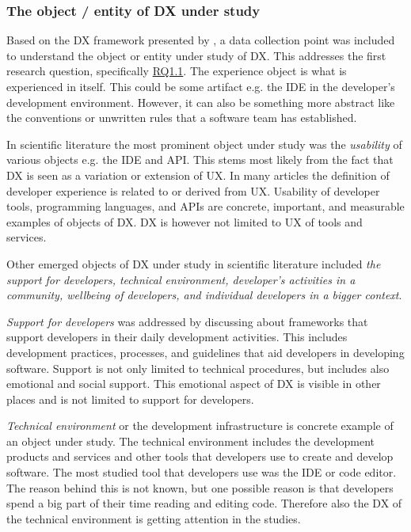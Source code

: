 \documentclass[english, 12pt, a4paper, sci, utf8, a-1b, online]{aaltothesis}
\newcounter{subsubsubsection}[subsubsection]
\begin{document}
\subsubsection{The object / entity of DX under study}

Based on the DX framework presented by \citet{fagerholm-doctoral-thesis}, a data collection point was included to understand the object or entity under study of DX. This addresses the first research question, specifically \hyperref[RQ1.1]{RQ1.1}. The experience object is what is experienced in itself. This could be some artifact e.g. the IDE in the developer's development environment. However, it can also be something more abstract like the conventions or unwritten rules that a software team has established.


In scientific literature the most prominent object under study was the \textit{usability} of various objects e.g. the IDE and API. This stems most likely from the fact that DX is seen as a variation or extension of UX. In many articles the definition of developer experience is related to or derived from UX. Usability of developer tools, programming languages, and APIs are concrete, important, and measurable examples of objects of DX. DX is however not limited to UX of tools and services.  

Other emerged objects of DX under study in scientific literature included \textit{the support for developers, technical environment, developer's activities in a community, wellbeing of developers, and individual developers in a bigger context}.

\textit{Support for developers} was addressed by discussing about frameworks that support developers in their daily development activities. This includes development practices, processes, and guidelines that aid developers in developing software. Support is not only limited to technical procedures, but includes also emotional and social support. This emotional aspect of DX is visible in other places and is not limited to support for developers. 

\textit{Technical environment} or the development infrastructure is concrete example of an object under study. The technical environment includes the development products and services and other tools that developers use to create and develop software. The most studied tool that developers use was the IDE or code editor. The reason behind this is not known, but one possible reason is that developers spend a big part of their time reading and editing code. Therefore also the DX of the technical environment is getting attention in the studies.
\end{document}

